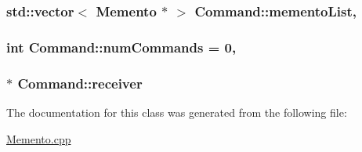 \subsubsection[{\texorpdfstring{memento\+List}{mementoList}}]{\setlength{\rightskip}{0pt plus 5cm}std\+::vector$<$ {\bf Memento} $\ast$ $>$ Command\+::memento\+List\hspace{0.3cm}{\ttfamily [static]}, {\ttfamily [private]}}\hypertarget{classCommand_a03c855537275970db8e4b9c7ea64a9f9}{}\label{classCommand_a03c855537275970db8e4b9c7ea64a9f9}
\subsubsection[{\texorpdfstring{num\+Commands}{numCommands}}]{\setlength{\rightskip}{0pt plus 5cm}int Command\+::num\+Commands = 0\hspace{0.3cm}{\ttfamily [static]}, {\ttfamily [private]}}\hypertarget{classCommand_a661b9cfc157529504ecf44528e4640b6}{}\label{classCommand_a661b9cfc157529504ecf44528e4640b6}
\subsubsection[{\texorpdfstring{receiver}{receiver}}]{$\ast$ Command\+::receiver\hspace{0.3cm}{\ttfamily [private]}}\hypertarget{classCommand_ac4a7e0c82bede3a8cd2f2b1478bd4763}{}\label{classCommand_ac4a7e0c82bede3a8cd2f2b1478bd4763}


The documentation for this class was generated from the following file\+:\begin{DoxyCompactItemize}
\item 
\hyperlink{Memento_8cpp}{Memento.\+cpp}\end{DoxyCompactItemize}
